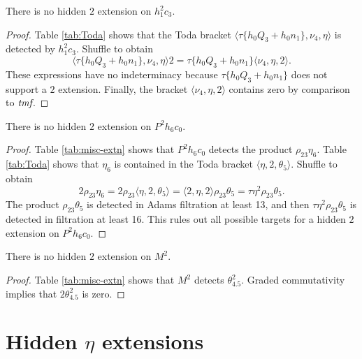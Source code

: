\begin{lemma}
\label{lem:2-h1^2c3}
There is no hidden $2$ extension on $h_1^2 c_3$.
\end{lemma}

\begin{proof}
Table \ref{tab:Toda} shows that the Toda
bracket $\langle \tau \{h_0 Q_3 + h_0 n_1\}, \nu_4, \eta \rangle$
is detected by $h_1^2 c_3$.
Shuffle to obtain
\[
\langle \tau \{h_0 Q_3 + h_0 n_1\}, \nu_4, \eta \rangle 2 =
\tau \{h_0 Q_3 + h_0 n_1\} \langle \nu_4, \eta, 2 \rangle.
\]
These expressions have no indeterminacy because
$\tau \{h_0 Q_3 + h_0 n_1\}$ does not support a $2$ extension.
Finally, the bracket $\langle \nu_4, \eta, 2 \rangle$
contains zero by comparison to $\textit{tmf}$.
\end{proof}

\begin{lemma}
\label{lem:2-P^2h6c0}
There is no hidden $2$ extension on $P^2 h_6 c_0$.
\end{lemma}

\begin{proof}
Table \ref{tab:misc-extn} shows that $P^2 h_6 c_0$ detects
the product $\rho_{23} \eta_6$.
Table \ref{tab:Toda} shows that $\eta_6$ is contained in the
Toda bracket $\langle \eta, 2, \theta_5 \rangle$.
Shuffle to obtain
\[
2 \rho_{23} \eta_6 =
2 \rho_{23} \langle \eta, 2, \theta_5 \rangle =
\langle 2, \eta, 2 \rangle \rho_{23} \theta_5 =
\tau \eta^2 \rho_{23} \theta_5.
\]
The product $\rho_{23} \theta_5$ is detected in Adams
filtration at least 13, and then $\tau \eta^2 \rho_{23} \theta_5$
is detected in filtration at least 16.  This rules out all possible
targets for a hidden $2$ extension on $P^2 h_6 c_0$.
\end{proof}


\begin{lemma}
\label{lem:2-M^2}
There is no hidden $2$ extension on $M^2$.
\end{lemma}

\begin{proof}
Table \ref{tab:misc-extn} shows that 
$M^2$ detects $\theta_{4.5}^2$.
Graded commutativity implies that $2 \theta_{4.5}^2$ is zero.
\end{proof}

\section{Hidden $\eta$ extensions}
\label{sctn:eta-extn}

